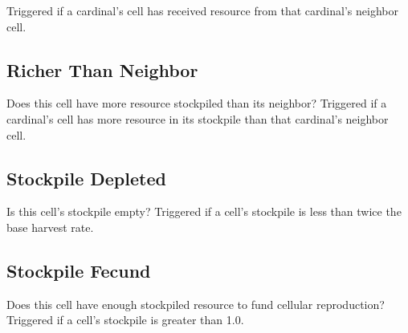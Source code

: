 Triggered if a cardinal's cell has received resource from that cardinal's neighbor cell.

\subsection{Richer Than Neighbor}

Does this cell have more resource stockpiled than its neighbor?
Triggered if a cardinal's cell has more resource in its stockpile than that cardinal's neighbor cell.

\subsection{Stockpile Depleted}

Is this cell's stockpile empty?
Triggered if a cell's stockpile is less than twice the base harvest rate.

\subsection{Stockpile Fecund}

Does this cell have enough stockpiled resource to fund cellular reproduction?
Triggered if a cell's stockpile is greater than 1.0.
